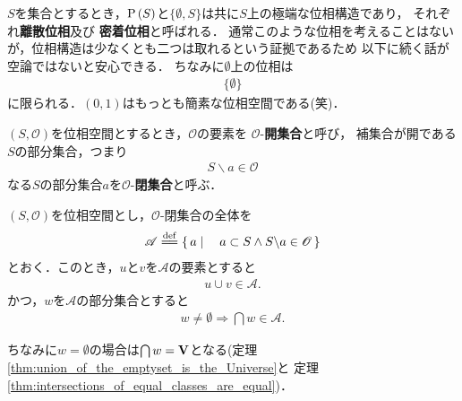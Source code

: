 	$S$を集合とするとき，$\operatorname*{P} \left(S\right)$と$\{\emptyset,S\}$は共に$S$上の極端な位相構造であり，
	それぞれ{\bf 離散位相}及び
	{\bf 密着位相}と呼ばれる．
	通常このような位相を考えることはないが，位相構造は少なくとも二つは取れるという証拠であるため
	以下に続く話が空論ではないと安心できる．
	ちなみに$\emptyset$上の位相は
	\begin{align}
		\{\emptyset\}
	\end{align}
	に限られる．$(0,1)$はもっとも簡素な位相空間である(笑)．
	
	\begin{screen}
		\begin{dfn}[開集合と閉集合]
			$(S,\mathscr{O})$を位相空間とするとき，$\mathscr{O}$の要素を
			$\mathscr{O}$-{\bf 開集合}と呼び，
			補集合が開である$S$の部分集合，つまり
			\begin{align}
				S \backslash a \in \mathscr{O}
			\end{align}
			なる$S$の部分集合$a$を$\mathscr{O}$-{\bf 閉集合}と呼ぶ．
		\end{dfn}
	\end{screen}
	
	\begin{screen}
		\begin{thm}[閉集合の全体は要素の対の合併と空でない部分集合の交叉で閉じる]
		\label{thm:union_of_two_closed_sets_is_closed_and_intersection_of_closed_sets_is_closed}
			$(S,\mathscr{O})$を位相空間とし，$\mathscr{O}$-閉集合の全体を
			\begin{align}
				\mathscr{A} \defeq \Set{a}{a \subset S \wedge S \backslash a \in \mathscr{O}}
			\end{align}
			とおく．このとき，$u$と$v$を$\mathscr{A}$の要素とすると
			\begin{align}
				u \cup v \in \mathscr{A}.
			\end{align}
			かつ，$w$を$\mathscr{A}$の部分集合とすると
			\begin{align}
				w \neq \emptyset \Longrightarrow \bigcap w \in \mathscr{A}.
			\end{align}
		\end{thm}
	\end{screen}
	
	ちなみに$w = \emptyset$の場合は$\bigcap w = \mathbf{V}$となる(定理\ref{thm:union_of_the_emptyset_is_the_Universe}と
	定理\ref{thm:intersections_of_equal_classes_are_equal})．
	
